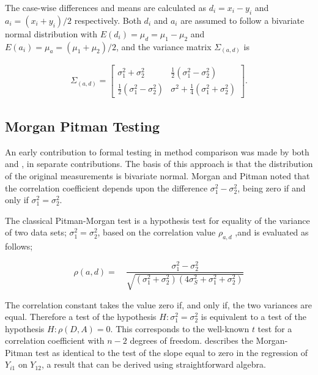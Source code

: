 \documentclass[12pt, a4paper]{report}
\theoremstyle{plain}
\theoremstyle{definition}
\theoremstyle{remark}
\begin{document}

The case-wise differences and means are calculated as $d_{i} =
x_{i}-y_{i}$ and $a_{i} = (x_{i}+y_{i})/2$  respectively. Both
$d_{i}$ and $a_{i}$ are assumed to follow a bivariate normal
distribution with $E(d_{i})= \mu_{d} = \mu_{1} - \mu_{2}$ and
$E(a_{i})= \mu_{a} = (\mu_{1} + \mu_{2})/2$, and the variance matrix
$\Sigma_{(a,d)}$ is

\begin{eqnarray}
\Sigma_{(a,d)}= \left[\begin{matrix}
\sigma^{2}_{1}+\sigma^{2}_{2}&\frac{1}{2}(\sigma^{2}_{1}-\sigma^{2}_{2})\\
\frac{1}{2}(\sigma^{2}_{1}-\sigma^{2}_{2})&\sigma^{2}+
\frac{1}{4}(\sigma^{2}_{1}+\sigma^{2}_{2})
\end{matrix} \right].
\end{eqnarray}



\subsection{Morgan Pitman Testing}
An early contribution to formal testing in method comparison was
made by both \citet{morgan} and \citet{pitman}, in separate
contributions. The basis of this approach is that the
distribution of the original measurements is bivariate normal.
Morgan and Pitman noted that the correlation coefficient depends
upon the difference $\sigma^{2}_{1}- \sigma^{2}_{2}$, being zero
if and only if $\sigma^{2}_{1}=\sigma^{2}_{2}$.

The classical Pitman-Morgan test is a hypothesis test for equality
of the variance of two data sets; $\sigma^{2}_{1} =
\sigma^{2}_{2}$, based on the correlation value $\rho_{a,d}$ ,and
is evaluated as follows;

\begin{equation}
\rho(a,d)=\quad\frac{\sigma^{2}_{1}-\sigma^{2}_{2}}{\sqrt{(\sigma^{2}_{1}+\sigma^{2}_{2})(4\sigma^{2}_{S}+\sigma^{2}_{1}+\sigma^{2}_{2})}}
\end{equation}

The correlation constant takes the value zero if, and only if, the two variances are equal. Therefore a test of the hypothesis $H: \sigma^{2}_{1}=\sigma^{2}_{2}$ is equivalent to a test of the hypothesis $H: \rho(D,A) = 0$. This corresponds to the well-known
$t$ test for a correlation coefficient with $n-2$ degrees of freedom. \citet{Bartko} describes the Morgan-Pitman test as identical to
the test of the slope equal to zero in the regression of $Y_{i1}$ on $Y_{12}$, a result that can be derived using
straightforward algebra.
\end{document}
